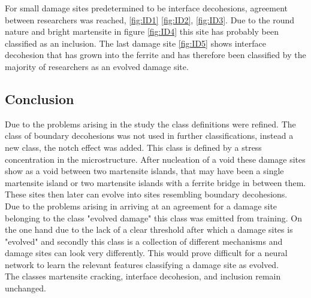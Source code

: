 For small damage sites predetermined to be interface decohesions, agreement between researchers was reached, \ref{fig:ID1} \ref{fig:ID2}, \ref{fig:ID3}. Due to the round nature and bright martensite in figure \ref{fig:ID4} this site has probably been classified as an inclusion. The last damage site \ref{fig:ID5} shows interface decohesion that has grown into the ferrite and has therefore been classified by the majority of researchers as an evolved damage site. 

\subsection{Conclusion}
Due to the problems arising in the study the class definitions were refined. The class of boundary decohesions was not used in further classifications, instead a new class, the notch effect was added. This class is defined by a stress concentration in the microstructure. After nucleation of a void these damage sites show as a void between two martensite islands, that may have been a single martensite island or two martensite islands with a ferrite bridge in between them. These sites then later can evolve into sites resembling boundary decohesions. \\

Due to the problems arising in arriving at an agreement for a damage site belonging to the class "evolved damage" this class was emitted from training. On the one hand due to the lack of a clear threshold after which a damage sites is "evolved" and secondly this class is a collection of different mechanisms and damage sites can look very differently. This would prove difficult for a neural network to learn the relevant features classifying a damage site as evolved. \\

The classes martensite cracking, interface decohesion, and inclusion remain unchanged. 


